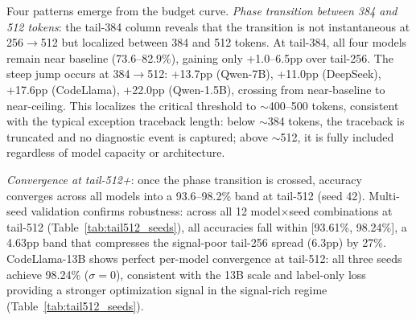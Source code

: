 Four patterns emerge from the budget curve.
\emph{Phase transition between 384 and 512 tokens}: the tail-384 column reveals that the transition is not instantaneous at 256$\to$512 but localized between 384 and 512 tokens.
At tail-384, all four models remain near baseline (73.6--82.9\%), gaining only +1.0--6.5pp over tail-256.
The steep jump occurs at 384$\to$512: +13.7pp (Qwen-7B), +11.0pp (DeepSeek), +17.6pp (CodeLlama), +22.0pp (Qwen-1.5B), crossing from near-baseline to near-ceiling.
This localizes the critical threshold to ${\sim}$400--500 tokens, consistent with the typical exception traceback length: below ${\sim}$384 tokens, the traceback is truncated and no diagnostic event is captured; above ${\sim}$512, it is fully included regardless of model capacity or architecture.

\emph{Convergence at tail-512+}: once the phase transition is crossed, accuracy converges across all models into a 93.6--98.2\% band at tail-512 (seed 42).
Multi-seed validation confirms robustness: across all 12 model$\times$seed combinations at tail-512 (Table~\ref{tab:tail512_seeds}), all accuracies fall within [93.61\%, 98.24\%], a 4.63pp band that compresses the signal-poor tail-256 spread (6.3pp) by 27\%.
CodeLlama-13B shows perfect per-model convergence at tail-512: all three seeds achieve 98.24\% ($\sigma{=}$0), consistent with the 13B scale and label-only loss providing a stronger optimization signal in the signal-rich regime (Table~\ref{tab:tail512_seeds}).

\begin{table}[t]
\centering
\caption{Cross-seed convergence at the tail-512 truncation point ($N{=}1{,}190$ per seed). All 12 model$\times$seed combinations fall within a 4.63pp band [93.61\%, 98.24\%]. CodeLlama-13B achieves identical accuracy across all three seeds ($\sigma{=}$0).}
\label{tab:tail512_seeds}
\small
{}
\end{table}

